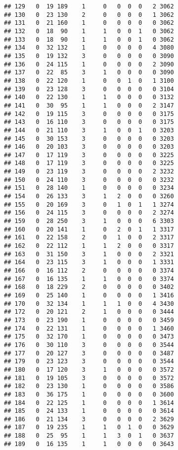\documentclass[]{book}
\begin{document}
\begin{verbatim}
## 129   0  19 189    1     0   0  0  0   2 3062
## 130   0  23 130    2     0   0  0  0   1 3062
## 131   0  21 160    1     0   0  0  0   0 3062
## 132   0  18  90    1     1   0  0  1   0 3062
## 133   0  18  90    1     1   0  0  1   0 3062
## 134   0  32 132    1     0   0  0  0   4 3080
## 135   0  19 132    3     0   0  0  0   0 3090
## 136   0  24 115    1     0   0  0  0   2 3090
## 137   0  22  85    3     1   0  0  0   0 3090
## 138   0  22 120    1     0   0  1  0   1 3100
## 139   0  23 128    3     0   0  0  0   0 3104
## 140   0  22 130    1     1   0  0  0   0 3132
## 141   0  30  95    1     1   0  0  0   2 3147
## 142   0  19 115    3     0   0  0  0   0 3175
## 143   0  16 110    3     0   0  0  0   0 3175
## 144   0  21 110    3     1   0  0  1   0 3203
## 145   0  30 153    3     0   0  0  0   0 3203
## 146   0  20 103    3     0   0  0  0   0 3203
## 147   0  17 119    3     0   0  0  0   0 3225
## 148   0  17 119    3     0   0  0  0   0 3225
## 149   0  23 119    3     0   0  0  0   2 3232
## 150   0  24 110    3     0   0  0  0   0 3232
## 151   0  28 140    1     0   0  0  0   0 3234
## 154   0  26 133    3     1   2  0  0   0 3260
## 155   0  20 169    3     0   1  0  1   1 3274
## 156   0  24 115    3     0   0  0  0   2 3274
## 159   0  28 250    3     1   0  0  0   6 3303
## 160   0  20 141    1     0   2  0  1   1 3317
## 161   0  22 158    2     0   1  0  0   2 3317
## 162   0  22 112    1     1   2  0  0   0 3317
## 163   0  31 150    3     1   0  0  0   2 3321
## 164   0  23 115    3     1   0  0  0   1 3331
## 166   0  16 112    2     0   0  0  0   0 3374
## 167   0  16 135    1     1   0  0  0   0 3374
## 168   0  18 229    2     0   0  0  0   0 3402
## 169   0  25 140    1     0   0  0  0   1 3416
## 170   0  32 134    1     1   1  0  0   4 3430
## 172   0  20 121    2     1   0  0  0   0 3444
## 173   0  23 190    1     0   0  0  0   0 3459
## 174   0  22 131    1     0   0  0  0   1 3460
## 175   0  32 170    1     0   0  0  0   0 3473
## 176   0  30 110    3     0   0  0  0   0 3544
## 177   0  20 127    3     0   0  0  0   0 3487
## 179   0  23 123    3     0   0  0  0   0 3544
## 180   0  17 120    3     1   0  0  0   0 3572
## 181   0  19 105    3     0   0  0  0   0 3572
## 182   0  23 130    1     0   0  0  0   0 3586
## 183   0  36 175    1     0   0  0  0   0 3600
## 184   0  22 125    1     0   0  0  0   1 3614
## 185   0  24 133    1     0   0  0  0   0 3614
## 186   0  21 134    3     0   0  0  0   2 3629
## 187   0  19 235    1     1   0  1  0   0 3629
## 188   0  25  95    1     1   3  0  1   0 3637
## 189   0  16 135    1     1   0  0  0   0 3643

\end{verbatim}
\end{document}
